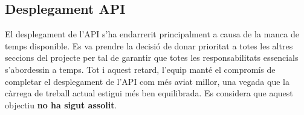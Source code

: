 \subsection{Desplegament API}
El desplegament de l'API s'ha endarrerit principalment a causa de la manca de temps disponible. Es va prendre la decisió de donar prioritat a totes les altres seccions del projecte per tal de garantir que totes les responsabilitats essencials s'abordessin a temps. Tot i aquest retard, l'equip manté el compromís de completar el desplegament de l'API com més aviat millor, una vegada que la càrrega de treball actual estigui més ben equilibrada. Es considera que aquest objectiu \textbf{no ha sigut assolit}.
